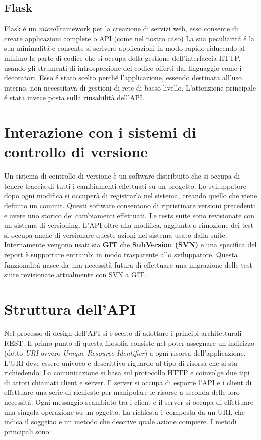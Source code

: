         \subsection{Flask}  
            Flask \'e un \textit{micro}Framework per la creazione di servizi web, esso consente di creare applicazioni complete o API (come nel nostro caso)
            La sua peculiarit\'a \'e la sua minimalit\'a e consente si scrivere applicazioni in modo rapido riducendo al minimo la parte di codice che si occupa della gestione dell'interfaccia HTTP, usando gli strumenti di introsprezione del codice offerti dal linguaggio come i decoratori.
            Esso \'e stato scelto perch\'e l'applicazione, essendo destinata all'uso interno, non necessitava di gestioni di rete di basso livello.
            L'attenzione principale \'e stata invece posta sulla riusabilità dell'API.

    \section{Interazione con i sistemi di controllo di versione}           
        Un sistema di controllo di versione è un software distribuito che si occupa di tenere traccia di tutti i cambiamenti effettuati su un progetto.
        Lo sviluppatore dopo ogni modifica si occuperà di registrarla nel sistema, creando quello che viene definito un commit.
        Questi software consentono di ripristinare versioni precedenti e avere uno storico dei cambiamenti effettuati.
        Le tests suite sono revisionate con un sistema di versioning.
        L'API oltre alla modifica, aggiunta o rimozione dei test si occupa anche di versionare queste azioni nel sistema usato dalla suite.
        Internamente vengono usati sia \textbf{GIT} che \textbf{SubVersion (SVN)} e una specifica del report è supportare entrambi in modo trasparente allo sviluppatore.
        Questa funzionalità nasce da una necessità futura di effettuare una migrazione delle test suite revisionate attualmente con SVN a GIT.
            
    \section{Struttura dell'API}
        Nel processo di design dell'API si è scelto di adottare i principi architetturali REST.
        Il primo punto di questa filosofia consiste nel poter assegnare un indirizzo (detto \textit{URI} ovvero \textit{Unique Resource Identifier}) a ogni risorsa dell'applicazione.
        L'URI deve essere univoco e descrittivo riguardo al tipo di risorsa che si sta richiedendo.
        La comunicazione si basa sul protocollo HTTP e coinvolge due tipi di attori chiamati client e server.
        Il server si occupa di esporre l'API e i client di effettuare una serie di richieste per manipolare le risorse a seconda delle loro necessità.
        Ogni messaggio scambiato tra i client e il server si occupa di effettuare una singola operazione su un oggetto.
        La richiesta è composta da un URI, che  indica il soggetto e un metodo che descrive quale azione compiere.
        I metodi principali sono:
        
